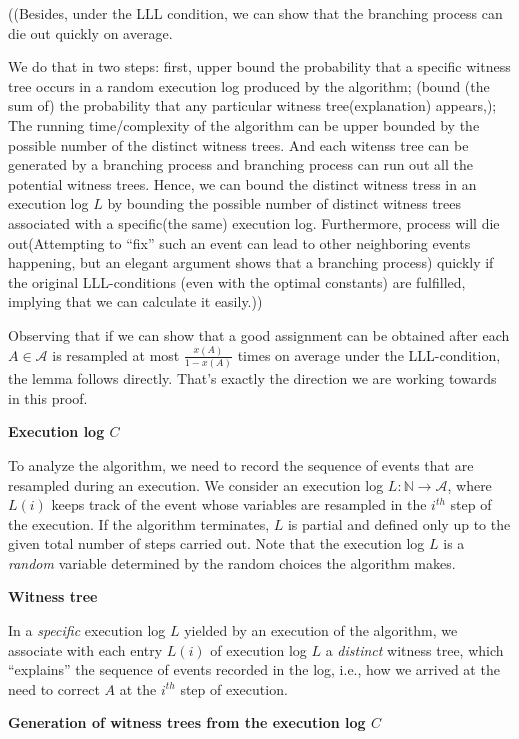 \documentclass[twoside]{article}
\begin{document}
((Besides, under the LLL condition, we can show that the branching process can die out quickly on average.

We do that in two steps: first, upper bound the probability that a specific witness tree occurs in a random execution log produced by the algorithm; (bound (the sum of) the probability that any particular witness tree(explanation) appears,); The running time/complexity of the algorithm can be upper bounded by the possible number of the distinct witness trees. And each witenss tree can be generated by a branching process and branching process can run out all the potential witness trees. Hence, we can bound the distinct witness tress in an execution log $L$ by bounding the possible number of distinct witness trees associated with a specific(the same) execution log. Furthermore, process will die out(Attempting to ``fix'' such an event can lead to other neighboring events happening, but an elegant argument shows that a branching process) quickly if the original LLL-conditions (even with the optimal constants) are fulfilled, implying that we can calculate it easily.))

Observing that if we can show that a good assignment can be obtained after each $A\in \mathcal{A}$ is resampled at most $\frac{x(A)}{1-x(A)}$ times on average under the LLL-condition, the lemma follows directly. That's exactly the direction we are working towards in this proof.

\textbf{Execution log $C$}

To analyze the algorithm, we need to record the sequence of events that are resampled during an execution. We consider an execution log $L:\mathbb{N}\rightarrow\mathcal{A}$, where $L(i)$ keeps track of the event whose variables are resampled in the $i^{th}$ step of the execution.  If the algorithm terminates, $L$ is partial and defined only up to the given total number of steps carried out. Note that the execution log $L$ is a \textit{random} variable determined by the random choices the algorithm makes.

\textbf{Witness tree}

In a \textit{specific} execution log $L$ yielded by an execution of the algorithm, we associate with each entry $L(i)$ of execution log $L$ a \textit{distinct}  witness tree, which  ``explains''  the sequence of events recorded in the log, i.e., how we arrived at the need to correct $A$ at the $i^{th}$ step of execution.

\textbf{Generation of witness trees from the execution log $C$}
\end{document}
